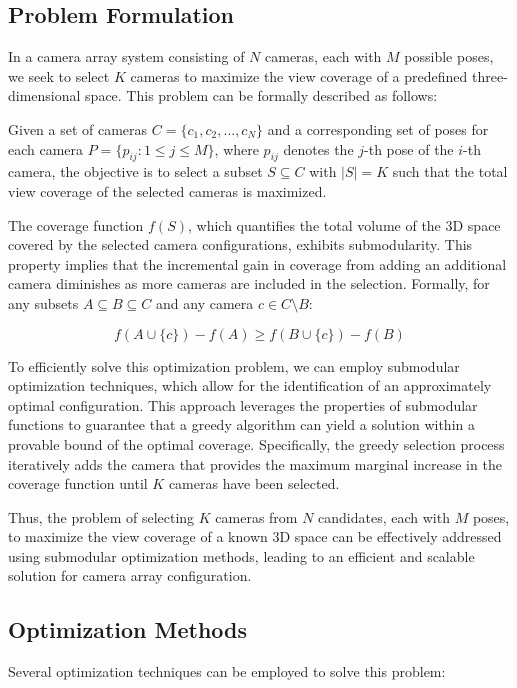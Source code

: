 \subsection{Problem Formulation}
In a camera array system consisting of \( N \) cameras, each with \( M \) possible poses, we seek to select \( K \) cameras to maximize the view coverage of a predefined three-dimensional space. This problem can be formally described as follows:

Given a set of cameras \( C = \{c_1, c_2, \ldots, c_N\} \) and a corresponding set of poses for each camera \( P = \{p_{ij} : 1 \leq j \leq M\} \), where \( p_{ij} \) denotes the \( j \)-th pose of the \( i \)-th camera, the objective is to select a subset \( S \subseteq C \) with \( |S| = K \) such that the total view coverage of the selected cameras is maximized.

The coverage function \( f(S) \), which quantifies the total volume of the 3D space covered by the selected camera configurations, exhibits submodularity. This property implies that the incremental gain in coverage from adding an additional camera diminishes as more cameras are included in the selection. Formally, for any subsets \( A \subseteq B \subseteq C \) and any camera \( c \in C \setminus B \):

\[
f(A \cup \{c\}) - f(A) \geq f(B \cup \{c\}) - f(B)
\]

To efficiently solve this optimization problem, we can employ submodular optimization techniques, which allow for the identification of an approximately optimal configuration. This approach leverages the properties of submodular functions to guarantee that a greedy algorithm can yield a solution within a provable bound of the optimal coverage. Specifically, the greedy selection process iteratively adds the camera that provides the maximum marginal increase in the coverage function until \( K \) cameras have been selected.

Thus, the problem of selecting \( K \) cameras from \( N \) candidates, each with \( M \) poses, to maximize the view coverage of a known 3D space can be effectively addressed using submodular optimization methods, leading to an efficient and scalable solution for camera array configuration.


\subsection{Optimization Methods}
Several optimization techniques can be employed to solve this problem:

